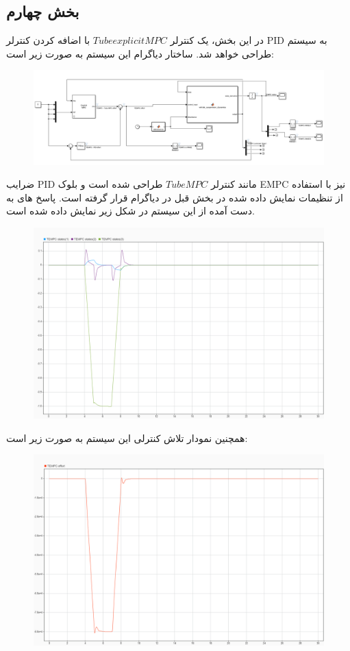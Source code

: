 \subsection*{بخش چهارم}
در این بخش، یک کنترلر $Tube explicit MPC$ با اضافه کردن کنترلر PID به سیستم طراحی خواهد شد. ساختار دیاگرام این سیستم به صورت زیر است:
\begin{figure}[H]
	\centering
	\includegraphics[width=0.7\linewidth]{../img/36}
	\caption{}
	\label{fig:36}
\end{figure}

ضرایب PID مانند کنترلر $Tube MPC$ طراحی شده است و بلوک EMPC نیز با استفاده از تنظیمات نمایش داده شده در بخش قبل در دیاگرام قرار گرفته است.
پاسخ های به دست آمده از این سیستم در شکل زیر نمایش داده شده است.
\begin{figure}[H]
	\centering
	\includegraphics[width=0.7\linewidth]{../img/37}
	\caption{}
	\label{fig:37}
\end{figure}

همچنین نمودار تلاش کنترلی این سیستم به صورت زیر است:
\begin{figure}[H]
	\centering
	\includegraphics[width=0.7\linewidth]{../img/38}
	\caption{}
	\label{fig:38}
\end{figure}

